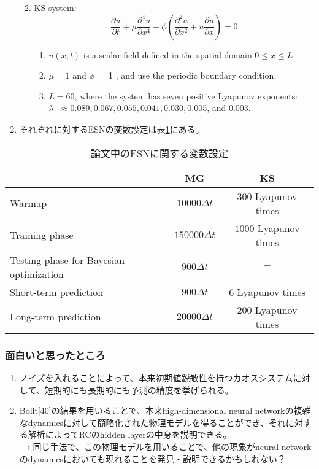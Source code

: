 \begin{enumerate}
\begin{enumerate}
\begin{enumerate}
    \end{enumerate}
    \item KS system: 
    $$\frac{\partial u}{\partial t}+\mu \frac{\partial^4 u}{\partial x^4}+\phi\left(\frac{\partial^2 u}{\partial x^2}+u \frac{\partial u}{\partial x}\right)=0$$
    \begin{enumerate}
      \item $u(x, t)$ is a scalar field defined in the spatial domain $0 \leqslant x \leqslant L$.
      \item $\mu=1$ and $\phi=$ 1 , and use the periodic boundary condition.
      \item $L=60$, where the system has seven positive Lyapunov exponents:\\ $\lambda_{+} \approx 0.089,0.067,0.055,0.041,0.030,0.005$, and 0.003. 
    \end{enumerate}
  \end{enumerate}
  \item それぞれに対するESNの変数設定は表\ref{tab:ESN_parameters_inpaper}にある。
\end{enumerate}

\begin{table}[h!]
  \centering
  \begin{tabular}{lcc}
      \toprule
      & MG & KS \\
      \midrule
      Warmup & $10000\Delta t$ & $300$ Lyapunov times \\
      Training phase & $150000\Delta t$ & $1000$ Lyapunov times \\
      Testing phase for Bayesian optimization & $900\Delta t$ & $-$ \\
      Short-term prediction & $900\Delta t$ & $6$ Lyapunov times \\
      Long-term prediction & $20000\Delta t$ & $200$ Lyapunov times \\
      \bottomrule
  \end{tabular}
  \caption{論文中のESNに関する変数設定}
  \label{tab:ESN_parameters_inpaper}
\end{table}


\subsubsection{面白いと思ったところ}
\begin{enumerate}
  \item ノイズを入れることによって、本来初期値鋭敏性を持つカオスシステムに対して、短期的にも長期的にも予測の精度を挙げられる。
  \item Bollt[40]の結果を用いることで、本来high-dimensional neural networkの複雑なdynamicsに対して簡略化された物理モデルを得ることができ、それに対する解析によってRCのhidden layerの中身を説明できる。
  \\$\longrightarrow$同じ手法で、この物理モデルを用いることで、他の現象がneural networkのdynamicsにおいても現れることを発見・説明できるかもしれない？
\end{enumerate}

